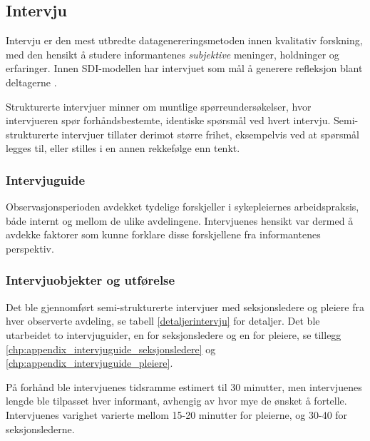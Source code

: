 \subsection{Intervju}
\label{sec:intervju}

Intervju er den mest utbredte datagenereringsmetoden innen kvalitativ forskning, med den hensikt å studere informantenes \textit{subjektive} meninger, holdninger og erfaringer. Innen SDI-modellen har intervjuet som mål å generere refleksjon blant deltagerne \citep{Tjora}.  


Strukturerte intervjuer minner om muntlige spørreundersøkelser, hvor intervjueren spør forhåndsbestemte, identiske spørsmål ved hvert intervju. Semi-strukturerte intervjuer tillater  derimot større frihet, eksempelvis ved at spørsmål legges til, eller stilles i en annen rekkefølge enn tenkt. 



\subsubsection{Intervjuguide}
Observasjonsperioden avdekket tydelige forskjeller i sykepleiernes arbeidspraksis, både internt og mellom de ulike avdelingene. Intervjuenes hensikt var dermed å avdekke faktorer som kunne forklare disse forskjellene fra informantenes perspektiv. 

\subsubsection{Intervjuobjekter og utførelse}



Det ble gjennomført semi-strukturerte intervjuer med seksjonsledere og pleiere fra hver observerte avdeling, se tabell \ref{detaljerintervju} for detaljer. Det ble utarbeidet to intervjuguider, en for seksjonsledere og en for pleiere, se tillegg \ref{chp:appendix_intervjuguide_seksjonsledere} og \ref{chp:appendix_intervjuguide_pleiere}.



 På forhånd ble intervjuenes tidsramme estimert til 30 minutter, men intervjuenes lengde ble tilpasset hver informant, avhengig av hvor mye de ønsket å fortelle. Intervjuenes varighet varierte mellom 15-20 minutter for pleierne, og 30-40 for seksjonslederne. 


